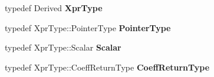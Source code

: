 \begin{DoxyCompactItemize}
typedef Derived {\bfseries Xpr\+Type}
\item 
\mbox{\label{struct_eigen_1_1internal_1_1mapbase__evaluator_a70ec31b534c7d98abad460b037be78a4}} 
typedef Xpr\+Type\+::\+Pointer\+Type {\bfseries Pointer\+Type}
\item 
\mbox{\label{struct_eigen_1_1internal_1_1mapbase__evaluator_a6ed4dac31c67f289147e3136e51f4284}} 
typedef Xpr\+Type\+::\+Scalar {\bfseries Scalar}
\item 
\mbox{\label{struct_eigen_1_1internal_1_1mapbase__evaluator_a8ecbb62e5ec7872f86b2a1ea087358ca}} 
typedef Xpr\+Type\+::\+Coeff\+Return\+Type {\bfseries Coeff\+Return\+Type}
\end{DoxyCompactItemize}
